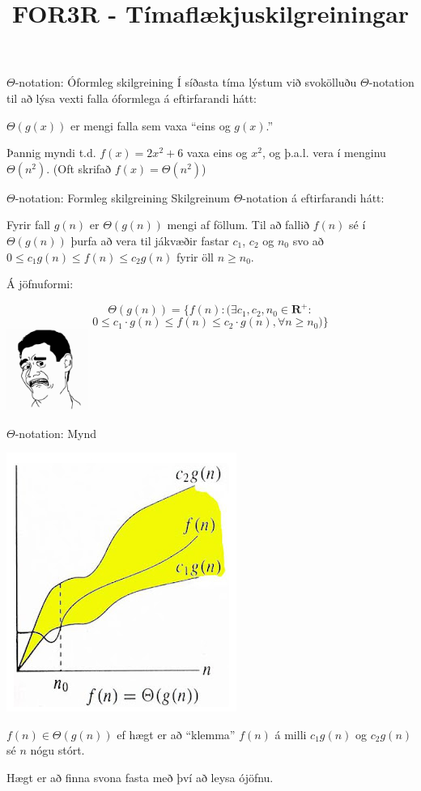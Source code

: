 \documentclass{beamer}
\title{FOR3R - Tímaflækjuskilgreiningar}
\begin{document}
\begin{frame}
\titlepage
\end{frame}

\begin{frame}{$\Theta$-notation: Óformleg skilgreining}
Í síðasta tíma lýstum við svokölluðu $\Theta$-notation til að lýsa vexti falla óformlega á eftirfarandi hátt:

\begin{center}
$\Theta(g(x))$ er mengi falla sem vaxa ``eins og $g(x)$.''
\end{center}

Þannig myndi t.d. $f(x) = 2 x^2 + 6$ vaxa eins og $x^2$, og þ.a.l. vera í menginu $\Theta(n^2)$. (Oft skrifað $f(x) = \Theta(n^2)$)
\end{frame}

\begin{frame}{$\Theta$-notation: Formleg skilgreining}
Skilgreinum $\Theta$-notation á eftirfarandi hátt:

Fyrir fall $g(n)$ er $\Theta(g(n))$ mengi af föllum. Til að fallið $f(n)$ sé í $\Theta(g(n))$ þurfa að vera til jákvæðir fastar $c_1$, $c_2$ og $n_0$ svo að $0 \leq c_1 g(n) \leq f(n) \leq c_2 g(n)$ fyrir öll $n \geq n_0$.

Á jöfnuformi:

\[\Theta(g(n)) = \{ f(n) : (\exists c_1, c_2, n_0 \in \mathbf{R}^+ :\]
\[0 \leq c_1 \cdot g(n) \leq f(n) \leq c_2 \cdot g(n), \forall n \geq n_0 )\}\]
\pause
\includegraphics[width=0.2\textwidth]{Pics/ewww}
\end{frame}

\begin{frame}{$\Theta$-notation: Mynd}
\begin{center}
\includegraphics[width=0.5\linewidth]{Pics/ThetaAsympoticNotation}
\end{center}
$f(n) \in \Theta(g(n))$ ef hægt er að ``klemma'' $f(n)$ á milli $c_1g(n)$ og $c_2g(n)$ sé $n$ nógu stórt.

Hægt er að finna svona fasta með því að leysa ójöfnu.
\end{frame}
\end{document}

